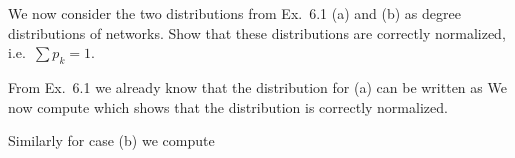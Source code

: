 
We now consider the two distributions from Ex.~6.1 (a) and (b) as degree distributions of networks. Show that these distributions are correctly normalized, i.e.~$\sum p_k =1$.

\solution
From Ex.~6.1 we already know that the distribution for (a) can be written as 
We now compute 
which shows that the distribution is correctly normalized. 

Similarly for case (b) we compute 
